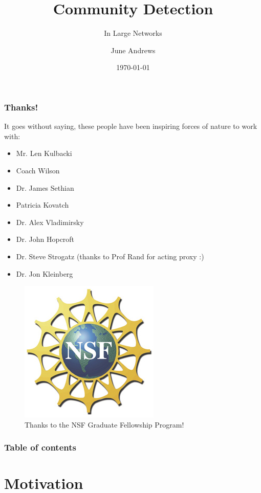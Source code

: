 \documentclass{beamer}
\begin{document}
\title{Community Detection}
\subtitle{In Large Networks}
\author{June Andrews}
\date{\today} 

\begin{frame}
\titlepage
\end{frame}


\begin{frame}\frametitle{Thanks!}
It goes without saying, these people have been inspiring forces of nature to work with:
\begin{itemize}
\item Mr. Len Kulbacki
\item Coach Wilson
\item Dr. James Sethian
\item Patricia Kovatch
\item Dr. Alex Vladimirsky
\item Dr. John Hopcroft
\item Dr. Steve Strogatz (thanks to Prof Rand for acting proxy :)
\item Dr. Jon Kleinberg
\end{itemize}

\begin{figure}
\includegraphics[width=.7in]{Figures/nsflogo} 
\caption{Thanks to the NSF Graduate Fellowship Program!}
\end{figure}

\end{frame}

\begin{frame}\frametitle{Table of contents}\tableofcontents
\end{frame} 


\section{Motivation}
\end{document}
